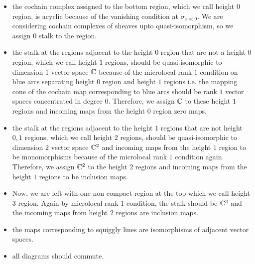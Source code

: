 \begin{itemize}
\item the cochain complex assigned to the bottom region, which we call height $0$ region, is acyclic because of the vanishing condition at $\sigma_{z\ll 0}$. We are considering cochain complexes of sheaves upto quasi-isomorphism, so we assign $0$ stalk to the region.

\item the stalk at the regions adjacent to the height $0$ region that are not a height $0$ region, which we call height $1$ regions, should be quasi-isomorphic to dimension $1$ vector space $\mathbb{C}$ because of the microlocal rank $1$ condition on blue arcs separating height $0$ region and height $1$ regions i.e. the mapping cone of the cochain map corresponding to blue arcs should be rank $1$ vector spaces concentrated in degree $0$. Therefore, we assign $\mathbb{C}$ to these height $1$ regions and incoming maps from the height $0$ region zero maps.

\item the stalk at the regions adjacent to the height $1$ regions that are not height $0,1$ regions, which we call height $2$ regions, should be quasi-isomorphic to dimension $2$ vector space $\mathbb{C}^2$ and incoming maps from the height $1$ region to be monomorphisms because of the microlocal rank $1$ condition again. Therefore, we assign $\mathbb{C}^2$ to the height $2$ regions and incoming maps from the height $1$ regions to be inclusion maps.

\item Now, we are left with one non-compact region at the top which we call height $3$ region. Again by microlocal rank $1$ condition, the stalk should be $\mathbb{C}^3$ and the incoming maps from height $2$ regions are inclusion maps.

\item the maps corresponding to squiggly lines are isomorphisms of adjacent vector spaces.

\item all diagrams should commute.


\end{itemize}
